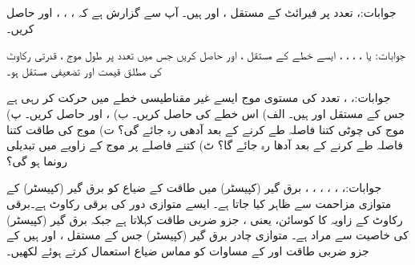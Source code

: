 جوابات:، 
 تعدد پر  فیرائٹ کے مستقل ،  اور  ہیں۔ آپ سے گزارش ہے کہ ، ، ،   اور  حاصل کریں۔

جوابات: یا ، ، ، ، 
ایسے خطے کے مستقل ،  اور  حاصل کریں جس میں   تعدد پر طول موج ، قدرتی رکاوٹ کی مطلق قیمت  اور  تضعیفی مستقل  ہو۔

جوابات:،  ،
 تعدد کی مستوی موج ایسے  غیر مقناطیسی خطے میں حرکت کر رہی ہے جس کے مستقل  اور  ہیں۔ الف) اس خطے کی  حاصل کریں۔ ب) ،  اور  حاصل کریں۔ پ) موج کی چوٹی کتنا فاصلہ طے کرنے کے بعد آدھی رہ جائے گی؟  ت) موج کی طاقت کتنا فاصلہ طے کرنے کے بعد آدھا رہ جائے گا؟   ٹ) کتنے فاصلے پر موج کے زاویے میں  تبدیلی رونما ہو گی؟

جوابات:، ، ، ، ، ، 
برق گیر (کپیسٹر)   میں طاقت کے ضیاع کو برق گیر (کپیسٹر)  کے متوازی مزاحمت  سے ظاہر کیا جاتا ہے۔ ایسے متوازی دور کی برقی رکاوٹ  ہے۔برقی رکاوٹ کے زاویہ  کا کوسائن، یعنی ، جزو ضربی طاقت کہلاتا ہے جبکہ برق گیر (کپیسٹر)  کی خاصیت  سے مراد  ہے۔ متوازی چادر برق گیر (کپیسٹر)   جس کے مستقل ،  اور  ہیں کے جزو ضربی طاقت اور  کے مساوات کو مماس ضیاع  استعمال کرتے ہوئے لکھیں۔

